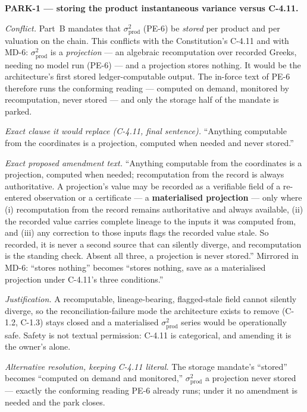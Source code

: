 \documentclass[11pt,a4paper]{article}
\newcommand{\sprod}{\sigma_{\mathrm{prod}}}
\begin{document}
\textbf{PARK-1 --- storing the product instantaneous variance versus C-4.11.}

\emph{Conflict.} Part~B mandates that $\sprod^2$ (PE-6) be \emph{stored} per
product and per valuation on the chain. This conflicts with the Constitution's
C-4.11 and with MD-6: $\sprod^2$ is a \emph{projection} --- an algebraic
recomputation over recorded Greeks, needing no model run (PE-6) --- and a
projection stores nothing. It would be the architecture's first stored
ledger-computable output. The in-force text of PE-6 therefore runs the
conforming reading --- computed on demand, monitored by recomputation, never
stored --- and only the storage half of the mandate is parked.

\emph{Exact clause it would replace (C-4.11, final sentence).} ``Anything
computable from the coordinates is a projection, computed when needed and never
stored.''

\emph{Exact proposed amendment text.} ``Anything computable from the coordinates
is a projection, computed when needed; recomputation from the record is always
authoritative. A projection's value may be recorded as a verifiable field of a
re-entered observation or a certificate --- a \textbf{materialised projection}
--- only where (i) recomputation from the record remains authoritative and always
available, (ii) the recorded value carries complete lineage to the inputs it was
computed from, and (iii) any correction to those inputs flags the recorded value
stale. So recorded, it is never a second source that can silently diverge, and
recomputation is the standing check. Absent all three, a projection is never
stored.'' Mirrored in MD-6: ``stores nothing'' becomes ``stores nothing, save as
a materialised projection under C-4.11's three conditions.''

\emph{Justification.} A recomputable, lineage-bearing, flagged-stale field cannot
silently diverge, so the reconciliation-failure mode the architecture exists to
remove (C-1.2, C-1.3) stays closed and a materialised $\sprod^2$ series would be
operationally safe. Safety is not textual permission: C-4.11 is categorical, and
amending it is the owner's alone.

\emph{Alternative resolution, keeping C-4.11 literal.} The storage mandate's
``stored'' becomes ``computed on demand and monitored,'' $\sprod^2$ a projection
never stored --- exactly the conforming reading PE-6 already runs; under it no
amendment is needed and the park closes.
\end{document}
